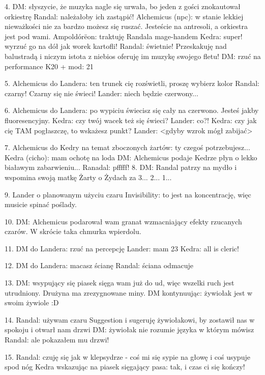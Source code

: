 \documentclass[10pt,twoside,twocolumn]{book}
\begin{document}
4. DM: słyszycie, że muzyka nagle się urwała, bo jeden z gości znokautował orkiestrę
Randal: należałoby ich zastąpić!
Alchemicus (npc): w stanie lekkiej nieważkości nie za bardzo możesz się ruszać. Jesteście na antresoli, a orkiestra jest pod wami.
Ampoldórëon: traktuję Randala mage-handem
Kedra: super! wyrzuć go na dół jak worek kartofli!
Randal: świetnie! Przeskakuję nad balustradą i niczym istota z niebios oferuję im muzykę swojego fletu!
DM: rzuć na performance
K20 + mod: 21

5. Alchemicus do Landera: ten trunek cię rozświetli, proszę wybierz kolor
Randal: czarny! Czarny się nie świeci!
Lander: niech będzie czerwony...


6. Alchemicus do Landera: po wypiciu świecisz się cały na czerwono. Jesteś jakby fluoresencyjny.
Kedra: czy twój wacek też się świeci?
Lander: co?!
Kedra: czy jak cię TAM pogłaszczę, to wskażesz punkt?
Lander: <gdyby wzrok mógł zabijać>

7. Alchemicus do Kedry na temat zboczonych żartów: ty czegoś potrzebujesz...
Kedra (cicho): mam ochotę na loda
DM: Alchemicus podaje Kedrze płyn o lekko białawym zabarwieniu...
Ranadal: pfffff!
8. DM: Randal patrzy na mydło i wspomina swoją matkę
Żarty o Żydach za 3... 2... 1...

9. Lander o planowanym użyciu czaru Invisibility: to jest na koncentrację, więc musicie spinać poślady.

10. DM: Alchemicus podarował wam granat wzmacniający efekty rzucanych czarów. W skrócie taka chmurka wpierdolu.

11. DM do Landera: rzuć na percepcję
Lander: mam 23
Kedra: all is cleric!

12. DM do Landera: macasz ścianę
Randal: ściana odmacuje

13. DM: wsypujący się piasek sięga wam już do ud, więc wszelki ruch jest utrudniony.
Drużyna ma zrezygnowane miny.
DM kontynuując: żywiołak jest w swoim żywiole :D

14. Randal: używam czaru Suggestion i sugeruję żywiołakowi, by zostawił nas w spokoju i otwarł nam drzwi
DM: żywiołak nie rozumie języka w którym mówisz
Randal: ale pokazałem mu drzwi!

15. Randal: czuję się jak w klepsydrze - coś mi się sypie na głowę i coś usypuje spod nóg
Kedra wskazując na piasek sięgający pasa: tak, i czas ci się kończy!

%    
%       
\end{document}
